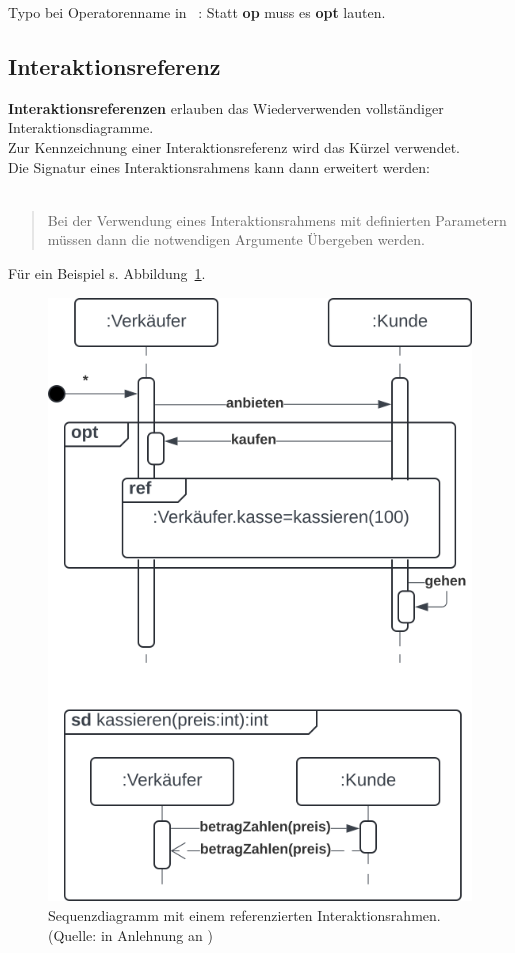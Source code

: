 \begin{tcolorbox}[title=Syntax Antworten,colback=red!20]
    Typo bei Operatorenname in ~\cite[34]{Buh09}:
    Statt \textbf{op} muss es \textbf{opt} lauten.
\end{tcolorbox}

\subsection{Interaktionsreferenz}

\textbf{Interaktionsreferenzen} erlauben das Wiederverwenden vollständiger Interaktionsdiagramme.\\
Zur Kennzeichnung einer Interaktionsreferenz wird das Kürzel  verwendet.\\
Die Signatur eines Interaktionsrahmens kann dann erweitert werden:\\

\noindent
{}\\

\blockquote[{\cite[35]{Buh09}}]{
Bei der Verwendung eines Interaktionsrahmens mit definierten Parametern müssen dann die notwendigen Argumente Übergeben werden.
}

Für ein Beispiel s. Abbildung~\ref{fig:interaktionsreferenz}.

\begin{figure}
    \centering
    \includegraphics[scale=0.5]{part three/Sequenzdiagramme/img/interaktionsreferenz}
    \caption{Sequenzdiagramm mit einem referenzierten Interaktionsrahmen. (Quelle: in Anlehnung an \cite[35]{Buh09})}
    \label{fig:interaktionsreferenz}
\end{figure}